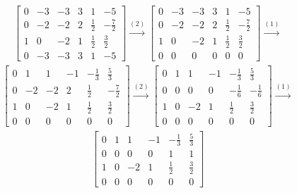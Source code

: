 \documentclass[12pt]{article}
\begin{document}
\begin{enumerate}
    \begin{align*}
      \begin{bmatrix}
        0 & -3 & -3 & 3 & 1           & -5\\
        0 & -2 & -2 & 2 & \frac{1}{2} & -\frac{7}{2}\\
        1 & 0  & -2 & 1 & \frac{1}{2} & \frac{3}{2}\\
        0 & -3 & -3 & 3 & 1           & -5
      \end{bmatrix}
      \xrightarrow{(2)}
      \begin{bmatrix}
        0 & -3 & -3 & 3 & 1           & -5\\
        0 & -2 & -2 & 2 & \frac{1}{2} & -\frac{7}{2}\\
        1 & 0  & -2 & 1 & \frac{1}{2} & \frac{3}{2}\\
        0 & 0  & 0  & 0 & 0           & 0
      \end{bmatrix}
      \xrightarrow{(1)}
    \end{align*}
    \begin{align*}
      \begin{bmatrix}
        0 & 1  & 1  & -1 & -\frac{1}{3} & \frac{5}{3}\\
        0 & -2 & -2 & 2  & \frac{1}{2}  & -\frac{7}{2}\\
        1 & 0  & -2 & 1  & \frac{1}{2}  & \frac{3}{2}\\
        0 & 0  & 0  & 0  & 0            & 0
      \end{bmatrix}
      \xrightarrow{(2)}
      \begin{bmatrix}
        0 & 1 & 1  & -1 & -\frac{1}{3} & \frac{5}{3}\\
        0 & 0 & 0  & 0  & -\frac{1}{6}  & -\frac{1}{6}\\
        1 & 0 & -2 & 1  & \frac{1}{2}  & \frac{3}{2}\\
        0 & 0 & 0  & 0  & 0            & 0
      \end{bmatrix}
      \xrightarrow{(1)}
    \end{align*}
    \begin{align*}
      \begin{bmatrix}
        0 & 1 & 1  & -1 & -\frac{1}{3} & \frac{5}{3}\\
        0 & 0 & 0  & 0  & 1            & 1\\
        1 & 0 & -2 & 1  & \frac{1}{2}  & \frac{3}{2}\\
        0 & 0 & 0  & 0  & 0            & 0
      \end{bmatrix}

\end{align*}
\end{enumerate}
\end{document}
